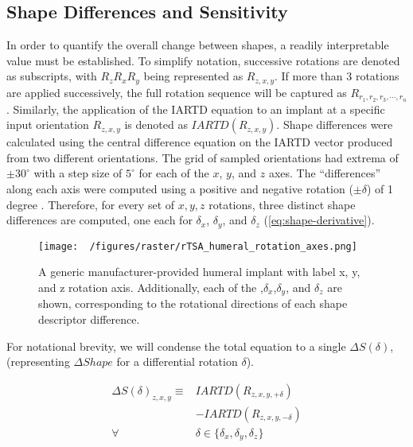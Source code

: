 \subsection{Shape Differences and Sensitivity}
In order to quantify the overall change between shapes, a readily interpretable value must be established.
To simplify notation, successive rotations are denoted as subscripts, with $R_{z}R_{x}R_{y}$ being represented as $R_{z,x,y}$.
If more than 3 rotations are applied successively, the full rotation sequence will be captured as $R_{r_{1},r_{2},r_{3},\cdots,r_{n}}$.
Similarly, the application of the IARTD equation to an implant at a specific input orientation $R_{z,x,y}$ is denoted as $IARTD(R_{z,x,y})$.
Shape differences were calculated using the central difference equation on the IARTD vector produced from two different orientations.
The grid of sampled orientations had extrema of $\pm 30^{\circ}$ with a step size of $5^{\circ}$ for each of the $x$, $y$, and $z$ axes.
The ``differences'' along each axis were computed using a positive and negative rotation ($\pm \delta $) of 1 degree .
Therefore, for every set of $x,y,z$ rotations, three distinct shape differences are computed, one each for $\delta_{x}$, $\delta_{y}$, and $\delta_{z}$ (\cref{eq:shape-derivative}).

\begin{figure}[h!]
  \centering
  \texttt{[image: ~/figures/raster/rTSA\_humeral\_rotation\_axes.png]}
  \caption{A generic manufacturer-provided humeral implant with label x, y, and z rotation axis. Additionally, each of the ,$\delta_x$,$\delta_y$, and $\delta_z$ are shown, corresponding to the rotational directions of each shape descriptor difference.}
  \label{fig:rot-axis}
\end{figure}

For notational brevity, we will condense the total equation to a single $\Delta S(\delta)$, (representing $\Delta Shape$ for a differential rotation $\delta$).

\begin{equation}
	\label{eq:shape-derivative}
	\begin{split}
		\Delta S(\delta)_{z,x,y}  \equiv & IARTD(R_{z,x,y,+\delta})                        \\
		                                 & - IARTD(R_{z,x,y,-\delta})                      \\
		\forall                          & \delta \in \{\delta_{x},\delta_{y},\delta_{z}\}
	\end{split}
\end{equation}

